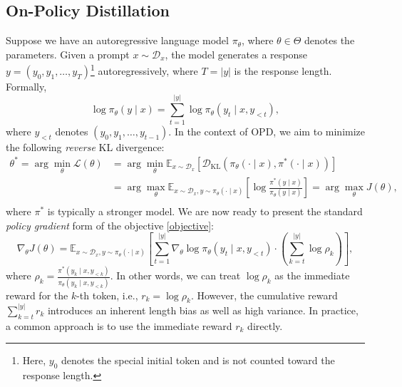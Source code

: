\documentclass{article}
\theoremstyle{plain}
\theoremstyle{definition}
\theoremstyle{remark}
\begin{document}
\subsection{On-Policy Distillation}\label{On-Policy Distillation}
Suppose we have an autoregressive language model $\pi_{\theta}$, where $\theta\in\Theta$ denotes the parameters. Given a prompt $x\sim\mathcal{D}_x$, the model generates a response $y=(y_0,y_1,\dots,y_T)$\footnote{Here, $y_0$ denotes the special initial token and is not counted toward the response length.} autoregressively, where $T=\lvert y\rvert$ is the response length. Formally,
\begin{equation}
	\log\pi_{\theta}(y\mid x)=\sum_{t=1}^{\lvert y\rvert}\log\pi_{\theta}(y_t\mid x,y_{<t}),
\end{equation}
where $y_{<t}$ denotes $(y_0,y_1,\dots,y_{t-1})$. In the context of OPD, we aim to minimize the following \textit{reverse} KL divergence:
\begin{equation}\label{objective}
	\begin{split}
		\theta^*=\arg\min_{\theta}\mathcal{L}(\theta)&=\arg\min_{\theta}\mathbb{E}_{x\sim\mathcal{D}_x}\left[\mathcal{D}_{\mathrm{KL}}(\pi_{\theta}(\cdot\mid x),\pi^*(\cdot\mid x))\right]\\
		&=\arg\max_{\theta}\mathbb{E}_{x\sim\mathcal{D}_x,y\sim\pi_{\theta}(\cdot\mid x)}\left[\log\frac{\pi^*(y\mid x)}{\pi_{\theta}(y\mid x)}\right]=\arg\max_{\theta}J(\theta),\\
	\end{split}
\end{equation}
where $\pi^*$ is typically a stronger model. We are now ready to present the standard \textit{policy gradient} form of the objective \eqref{objective}:
\begin{equation}\label{policy gradient}
	\nabla_{\theta}J(\theta)=\mathbb{E}_{x\sim\mathcal{D}_x,y\sim\pi_{\theta}(\cdot\mid x)}\left[\sum_{t=1}^{\lvert y\rvert}\nabla_{\theta}\log\pi_{\theta}(y_t\mid x,y_{<t})\cdot\left(\sum_{k=t}^{\lvert y\rvert}\log\rho_k\right)\right],
\end{equation}
where $\rho_k=\frac{\pi^*(y_k\mid x,y_{<k})}{\pi_{\theta}(y_k\mid x,y_{<k})}$. In other words, we can treat $\log\rho_k$ as the immediate reward for the $k$-th token, i.e., $r_k=\log\rho_k$. However, the cumulative reward $\sum_{k=t}^{\lvert y\rvert}r_k$ introduces an inherent length bias as well as high variance. In practice, a common approach is to use the immediate reward $r_k$ directly.
\end{document}
